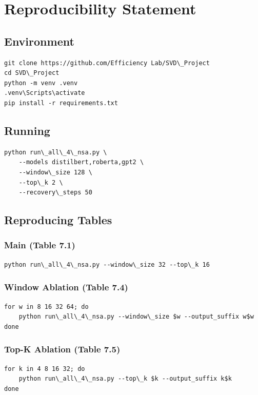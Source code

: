 
\section{Reproducibility Statement}

\subsection{Environment}

\begin{lstlisting}
git clone https://github.com/Efficiency Lab/SVD\_Project
cd SVD\_Project
python -m venv .venv
.venv\Scripts\activate
pip install -r requirements.txt
\end{lstlisting}

\subsection{Running}

\begin{lstlisting}
python run\_all\_4\_nsa.py \
    --models distilbert,roberta,gpt2 \
    --window\_size 128 \
    --top\_k 2 \
    --recovery\_steps 50
\end{lstlisting}

\subsection{Reproducing Tables}

\subsubsection{Main (Table 7.1)}
\begin{lstlisting}
python run\_all\_4\_nsa.py --window\_size 32 --top\_k 16
\end{lstlisting}

\subsubsection{Window Ablation (Table 7.4)}
\begin{lstlisting}
for w in 8 16 32 64; do
    python run\_all\_4\_nsa.py --window\_size $w --output_suffix w$w
done
\end{lstlisting}

\subsubsection{Top-K Ablation (Table 7.5)}
\begin{lstlisting}
for k in 4 8 16 32; do
    python run\_all\_4\_nsa.py --top\_k $k --output_suffix k$k
done
\end{lstlisting}

